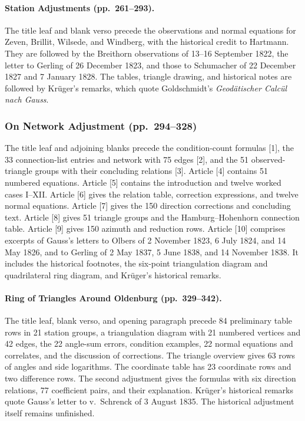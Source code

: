 \paragraph{Station Adjustments (pp.~261--293).}
The title leaf and blank verso precede the observations and normal equations for Zeven, Brillit, Wilsede, and Windberg, with the historical credit to Hartmann. They are followed by the Breithorn observations of 13--16 September 1822, the letter to Gerling of 26 December 1823, and those to Schumacher of 22 December 1827 and 7 January 1828. The tables, triangle drawing, and historical notes are followed by Krüger's remarks, which quote Goldschmidt's \textit{Geodätischer Calcül nach Gauss}.

\subsubsection*{On Network Adjustment (pp.~294--328)}
The title leaf and adjoining blanks precede the condition-count formulas [1], the 33 connection-list entries and network with 75 edges [2], and the 51 observed-triangle groups with their concluding relations [3]. Article [4] contains 51 numbered equations. Article [5] contains the introduction and twelve worked cases I--XII. Article [6] gives the relation table, correction expressions, and twelve normal equations. Article [7] gives the 150 direction corrections and concluding text. Article [8] gives 51 triangle groups and the Hamburg--Hohenhorn connection table. Article [9] gives 150 azimuth and reduction rows. Article [10] comprises excerpts of Gauss's letters to Olbers of 2 November 1823, 6 July 1824, and 14 May 1826, and to Gerling of 2 May 1837, 5 June 1838, and 14 November 1838. It includes the historical footnotes, the six-point triangulation diagram and quadrilateral ring diagram, and Krüger's historical remarks.

\paragraph{Ring of Triangles Around Oldenburg (pp.~329--342).}
The title leaf, blank verso, and opening paragraph precede 84 preliminary table rows in 21 station groups, a triangulation diagram with 21 numbered vertices and 42 edges, the 22 angle-sum errors, condition examples, 22 normal equations and correlates, and the discussion of corrections. The triangle overview gives 63 rows of angles and side logarithms. The coordinate table has 23 coordinate rows and two difference rows. The second adjustment gives the formulas with six direction relations, 77 coefficient pairs, and their explanation. Krüger's historical remarks quote Gauss's letter to v.~Schrenck of 3 August 1835. The historical adjustment itself remains unfinished.

